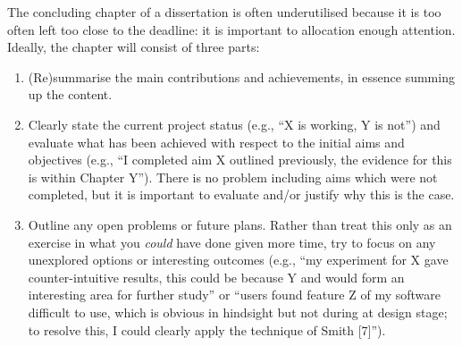 \documentclass[ %
                    author={Dillon Keith Diep},
                supervisor={Dr. Carl Henrik Ek},
                    degree={MEng},
                     title={Assisted Content Generation for 3D Hair Geometry},
                  subtitle={[INCOMPLETE DRAFT, CONTAINS NOTES FROM RESEARCH]},
                      type={Research},
                      year={2014} ]{dissertation}
\begin{document}
\noindent
The concluding chapter of a dissertation is often underutilised because it 
is too often left too close to the deadline: it is important to allocation
enough attention.  Ideally, the chapter will consist of three parts:

\begin{enumerate}
\item (Re)summarise the main contributions and achievements, in essence
      summing up the content.
\item Clearly state the current project status (e.g., ``X is working, Y 
      is not'') and evaluate what has been achieved with respect to the 
      initial aims and objectives (e.g., ``I completed aim X outlined 
      previously, the evidence for this is within Chapter Y'').  There 
      is no problem including aims which were not completed, but it is 
      important to evaluate and/or justify why this is the case.
\item Outline any open problems or future plans.  Rather than treat this
      only as an exercise in what you {\em could} have done given more 
      time, try to focus on any unexplored options or interesting outcomes
      (e.g., ``my experiment for X gave counter-intuitive results, this 
      could be because Y and would form an interesting area for further 
      study'' or ``users found feature Z of my software difficult to use,
      which is obvious in hindsight but not during at design stage; to 
      resolve this, I could clearly apply the technique of Smith [7]'').
\end{enumerate}


%
%

\backmatter



\end{document}
